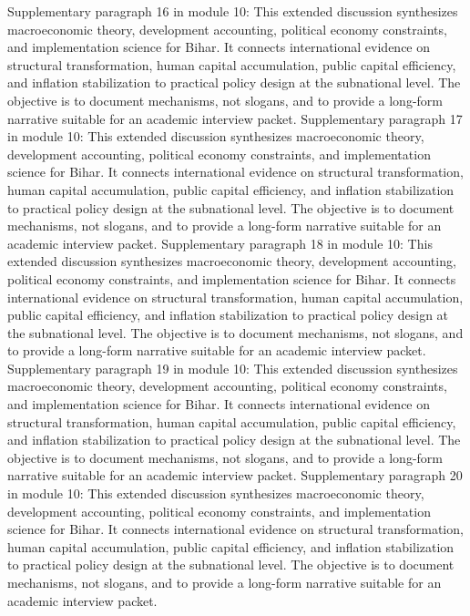 \documentclass[preprint,12pt]{elsarticle}
\begin{document}
Supplementary paragraph 16 in module 10: This extended discussion synthesizes macroeconomic theory, development accounting, political economy constraints, and implementation science for Bihar. It connects international evidence on structural transformation, human capital accumulation, public capital efficiency, and inflation stabilization to practical policy design at the subnational level. The objective is to document mechanisms, not slogans, and to provide a long-form narrative suitable for an academic interview packet.
Supplementary paragraph 17 in module 10: This extended discussion synthesizes macroeconomic theory, development accounting, political economy constraints, and implementation science for Bihar. It connects international evidence on structural transformation, human capital accumulation, public capital efficiency, and inflation stabilization to practical policy design at the subnational level. The objective is to document mechanisms, not slogans, and to provide a long-form narrative suitable for an academic interview packet.
Supplementary paragraph 18 in module 10: This extended discussion synthesizes macroeconomic theory, development accounting, political economy constraints, and implementation science for Bihar. It connects international evidence on structural transformation, human capital accumulation, public capital efficiency, and inflation stabilization to practical policy design at the subnational level. The objective is to document mechanisms, not slogans, and to provide a long-form narrative suitable for an academic interview packet.
Supplementary paragraph 19 in module 10: This extended discussion synthesizes macroeconomic theory, development accounting, political economy constraints, and implementation science for Bihar. It connects international evidence on structural transformation, human capital accumulation, public capital efficiency, and inflation stabilization to practical policy design at the subnational level. The objective is to document mechanisms, not slogans, and to provide a long-form narrative suitable for an academic interview packet.
Supplementary paragraph 20 in module 10: This extended discussion synthesizes macroeconomic theory, development accounting, political economy constraints, and implementation science for Bihar. It connects international evidence on structural transformation, human capital accumulation, public capital efficiency, and inflation stabilization to practical policy design at the subnational level. The objective is to document mechanisms, not slogans, and to provide a long-form narrative suitable for an academic interview packet.
\end{document}
